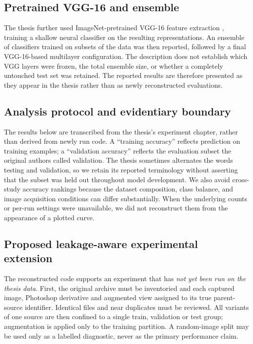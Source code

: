 \documentclass[conference,a4paper]{IEEEtran}
\begin{document}
\subsection{Pretrained VGG-16 and ensemble}
The thesis further used ImageNet-pretrained VGG-16 feature extraction \cite{vgg}, training a shallow neural classifier on the resulting representations. An ensemble of classifiers trained on subsets of the data was then reported, followed by a final VGG-16-based multilayer configuration. The description does not establish which VGG layers were frozen, the total ensemble size, or whether a completely untouched test set was retained. The reported results are therefore presented as they appear in the thesis rather than as newly reconstructed evaluations.

\subsection{Analysis protocol and evidentiary boundary}
The results below are transcribed from the thesis's experiment chapter, rather than derived from newly run code. A ``training accuracy'' reflects prediction on training examples; a ``validation accuracy'' reflects the evaluation subset the original authors called validation. The thesis sometimes alternates the words testing and validation, so we retain its reported terminology without asserting that the subset was held out throughout model development. We also avoid cross-study accuracy rankings because the dataset composition, class balance, and image acquisition conditions can differ substantially. When the underlying counts or per-run settings were unavailable, we did not reconstruct them from the appearance of a plotted curve.

\subsection{Proposed leakage-aware experimental extension}
The reconstructed code supports an experiment that has \emph{not yet been run on the thesis data}. First, the original archive must be inventoried and each captured image, Photoshop derivative and augmented view assigned to its true parent-source identifier. Identical files and near duplicates must be reviewed. All variants of one source are then confined to a single train, validation or test group; augmentation is applied only to the training partition. A random-image split may be used only as a labelled diagnostic, never as the primary performance claim.
\end{document}
